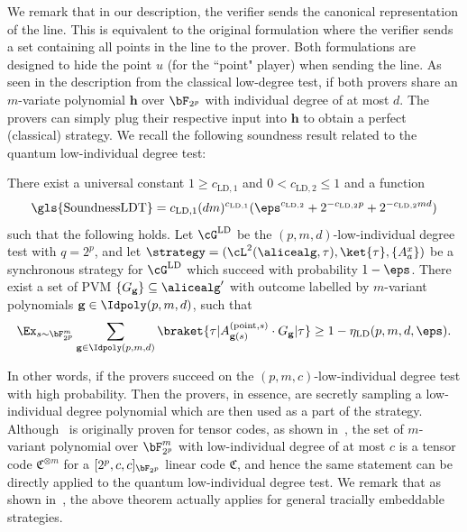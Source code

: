  We remark that in our description, the verifier sends the canonical representation of the line. This is equivalent to the original formulation where the verifier sends a set containing all points in the line to the prover. Both formulations are designed to hide the point $u$ (for the ``point" player) when sending the line. As seen in the description from the classical low-degree test, if both provers share an $m$-variate polynomial $\textbf{h}$ over $\bF_{2^p}$ with individual degree of at most $d$. The provers can simply plug their respective input into $\textbf{h}$ to obtain a perfect (classical) strategy. We recall the following soundness result related to the quantum low-individual degree test:
\begin{theorem} \label{thm:soundnessQLDT}
	There exist a universal constant $1 \geq c_{\text{LD},1}$ and $0 < c_{\text{LD},2} \leq 1$  and a function 
	\begin{equation*}
		\text{\gls{SoundnessLDT}} =  c_{\text{LD},1} (dm)^{c_{\text{LD},1}} (\eps^{c_{\text{LD},2}} + 2^{-c_{\text{LD},2}p} + 2^{-c_{\text{LD},2}md})
	\end{equation*}
	such that the following holds. Let $\cG^{\text{LD}}$ be the $(p,m,d)$-low-individual degree test with $q = 2^p$, and let $\strategy =( \cL^2(\alicealg, \tau), \ket{\tau},\{ A_{a}^x \} )$ be a synchronous strategy for $\cG^{\text{LD}}$ which succeed with probability $1- \eps$. There exist a set of PVM $\{G_{\textbf{g}}\} \subseteq \alicealg'$ with outcome labelled by $m$-variant polynomials $\textbf{g} \in \Idpoly(p,m,d)$, such that 
	\begin{equation*} 
		\Ex_{s \sim \bF_{2^p}^m} \sum_{\textbf{g} \in \Idpoly(p,m,d)} \braket{\tau| A^{(\text{point}, s)}_{\textbf{g}(s)} \cdot  G_{\textbf{g}} |\tau} \geq 1 - \mathbf{\eta}_{\text{LD}}(p,m,d,\eps).
	\end{equation*}
\end{theorem}
In other words, if the provers succeed on the $(p,m,c)$-low-individual degree test with high probability. Then the provers, in essence, are secretly sampling a low-individual degree polynomial which are then used as a part of the strategy. Although~\cite[Theorem 4.1]{jiQuantumSoundnessTesting2022} is originally proven for tensor codes, as shown in~, the set of $m$-variant polynomial over $\bF_{2^p}^m$ with low-individual degree of at most $c$ is a tensor code $\mathfrak{C}^{\otimes m}$ for a $[2^p, c, c]_{\bF_{2^p}}$ linear code $\mathfrak{C}$, and hence the same statement can be directly applied to the quantum low-individual degree test. We remark that as shown in~\cite[Corollary 4.4]{linTracialEmbeddableStrategies2024}, the above theorem actually applies for general tracially embeddable strategies. 



